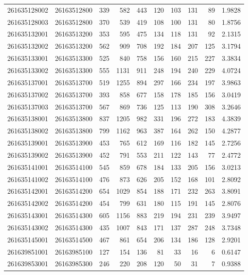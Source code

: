 \documentclass[
  11pt,
]{article}
\begin{document}
\begin{longtable}[t]{llrrrrrrrr}
261635128002 & 26163512800 & 339 & 582 & 443 & 120 & 103 & 131 & 89 & 1.9828\\
261635128003 & 26163512800 & 370 & 539 & 419 & 108 & 100 & 131 & 80 & 1.8756\\
261635132001 & 26163513200 & 353 & 595 & 475 & 134 & 118 & 131 & 92 & 2.1315\\
261635132002 & 26163513200 & 562 & 909 & 708 & 192 & 184 & 207 & 125 & 3.1794\\
261635133001 & 26163513300 & 525 & 840 & 758 & 156 & 160 & 215 & 227 & 3.3834\\
261635133002 & 26163513300 & 555 & 1131 & 911 & 248 & 194 & 240 & 229 & 4.0724\\
261635137001 & 26163513700 & 519 & 1255 & 894 & 297 & 166 & 234 & 197 & 3.9863\\
261635137002 & 26163513700 & 393 & 858 & 677 & 158 & 178 & 185 & 156 & 3.0419\\
261635137003 & 26163513700 & 567 & 869 & 736 & 125 & 113 & 190 & 308 & 3.2646\\
261635138001 & 26163513800 & 837 & 1205 & 982 & 331 & 196 & 272 & 183 & 4.3839\\
261635138002 & 26163513800 & 799 & 1162 & 963 & 387 & 164 & 262 & 150 & 4.2877\\
261635139001 & 26163513900 & 453 & 765 & 612 & 169 & 116 & 182 & 145 & 2.7256\\
261635139002 & 26163513900 & 452 & 791 & 553 & 211 & 122 & 143 & 77 & 2.4772\\
261635141001 & 26163514100 & 545 & 859 & 678 & 184 & 133 & 205 & 156 & 3.0213\\
261635141002 & 26163514100 & 476 & 873 & 626 & 205 & 152 & 168 & 101 & 2.8092\\
261635142001 & 26163514200 & 654 & 1029 & 854 & 188 & 171 & 232 & 263 & 3.8091\\
261635142002 & 26163514200 & 454 & 799 & 631 & 180 & 115 & 191 & 145 & 2.8076\\
261635143001 & 26163514300 & 605 & 1156 & 883 & 219 & 194 & 231 & 239 & 3.9497\\
261635143002 & 26163514300 & 435 & 1007 & 843 & 171 & 137 & 287 & 248 & 3.7348\\
261635145001 & 26163514500 & 467 & 861 & 654 & 206 & 134 & 186 & 128 & 2.9201\\
261639851001 & 26163985100 & 127 & 154 & 136 & 81 & 33 & 16 & 6 & 0.6147\\
261639853001 & 26163985300 & 246 & 220 & 208 & 120 & 50 & 31 & 7 & 0.9388\\

\end{longtable}
\end{document}
